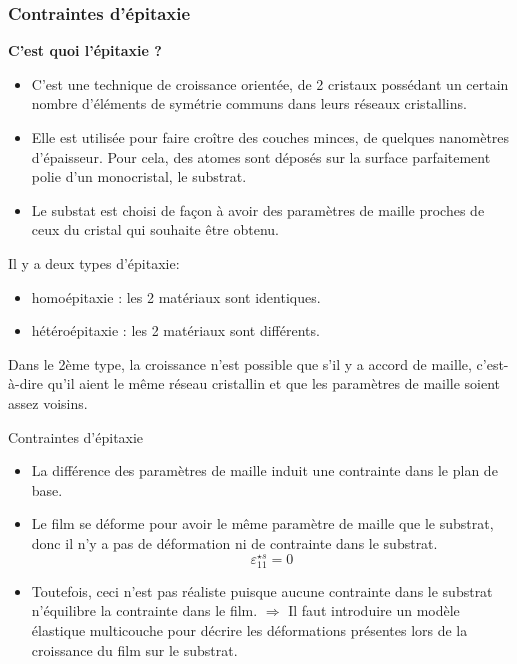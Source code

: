 \begin{frame}
    \frametitle{Contraintes d'épitaxie}
    \textbf{\Large{C'est quoi l'épitaxie ?}}
    \begin{itemize}
        \item C'est une technique de croissance orientée, de 2 cristaux possédant un certain nombre d'éléments de symétrie communs dans leurs réseaux cristallins.
        \item Elle est utilisée pour faire croître des couches minces, de quelques nanomètres d'épaisseur. Pour cela, des atomes sont déposés sur la surface parfaitement polie d'un monocristal, le substrat.
        \item Le substat est choisi de façon à avoir des paramètres de maille proches de ceux du cristal qui souhaite être obtenu.
    \end{itemize}
    Il y a deux types d'épitaxie:
    \begin{itemize}
        \item homoépitaxie   : les 2 matériaux sont identiques.
        \item hétéroépitaxie : les 2 matériaux sont différents.
    \end{itemize}
    Dans le 2ème type, la croissance n'est possible que s'il y a accord de maille, c'est-à-dire qu'il aient le même réseau cristallin et que les paramètres de maille soient assez voisins.
    
\end{frame}

\begin{frame}{Contraintes d'épitaxie}
    \begin{itemize}
        \item La différence des paramètres de maille induit une contrainte dans le plan de base.
        \item Le film se déforme pour avoir le même paramètre de maille que le substrat, donc il n'y a pas de déformation ni de contrainte dans le substrat.$$ \varepsilon _{11} ^{\star s} = 0 $$
        \item Toutefois, ceci n'est pas réaliste puisque aucune contrainte dans le substrat n'équilibre la contrainte dans le film. $\Rightarrow$ Il faut introduire un modèle élastique multicouche pour décrire les déformations présentes lors de la croissance du film sur le substrat.
    \end{itemize}
\end{frame}

